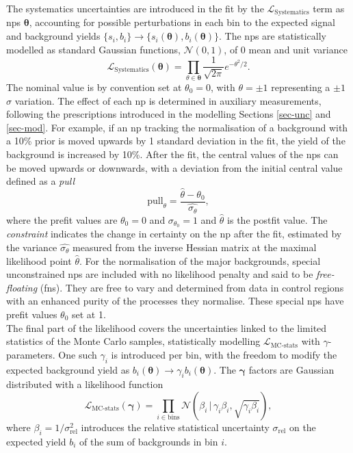 The systematics uncertainties are introduced in the fit by the $\mathcal{L}_{\text{Systematics}}$ term as \glspl{np} $\boldsymbol{\theta}$, accounting for possible perturbations in each bin to the expected signal and background yields $\{s_i, b_i\} \rightarrow \{s_i(\boldsymbol{\theta}), b_i(\boldsymbol{\theta})\}$. The \glspl{np} are statistically modelled as standard Gaussian functions, $\mathcal{N}(0, 1)$, of 0 mean and unit variance \[ \mathcal{L}_{\text{Systematics}}(\boldsymbol{\theta}) = \prod_{\theta \in \boldsymbol{\theta}} \frac{1}{\sqrt{2\pi}} e^{- \theta^2/2}.\] The nominal value is by convention set at $\theta_0 = 0$, with $\theta = \pm 1$ representing a $\pm1$ $\sigma$ variation. The effect of each \gls{np} is determined in auxiliary measurements, following the prescriptions introduced in the modelling Sections \ref{sec-unc} and \ref{sec-mod}. For example, if an \gls{np} tracking the normalisation of a background with a 10\% prior is moved upwards by 1 standard deviation in the fit, the yield of the background is increased by 10\%. After the fit, the central values of the \glspl{np} can be moved upwards or downwards, with a deviation from the initial central value defined as a \textit{pull} \[ \text{pull}_{\theta} = \frac{\hat{\theta} - \theta_0}{\hat{\sigma_{\theta}}}, \] where the prefit values are $\theta_0 = 0 $ and $\sigma_{\theta_0} = 1$ and $\hat{\theta}$ is the postfit value. The \textit{constraint} indicates the change in certainty on the \gls{np} after the fit, estimated by the variance $\hat{\sigma_{\theta}}$ measured from the inverse Hessian matrix at the maximal likelihood point $\hat{\theta}$. For the normalisation of the major backgrounds, special unconstrained \glspl{np} are included with no likelihood penalty and said to be \textit{free-floating} (\glspl{fn}). They are free to vary and determined from data in control regions with an enhanced purity of the processes they normalise. These special \glspl{np} have prefit values $\theta_0$ set at 1. \\

The final part of the likelihood covers the uncertainties linked to the limited statistics of the Monte Carlo samples, statistically modelling $\mathcal{L}_{\text{MC-stats}}$ with $\gamma$-parameters. One such $\gamma_i$ is introduced per bin, with the freedom to modify the expected background yield as $b_i(\boldsymbol{\theta}) \rightarrow \gamma_i b_i(\boldsymbol{\theta})$. The $\boldsymbol{\gamma}$ factors are Gaussian distributed with a likelihood function \[\mathcal{L}_{\text{MC-stats}}(\boldsymbol{\gamma}) = \prod_{i\in \textrm{bins}} \mathcal{N} \left(\beta_i \,|\, \gamma_i\beta_i, \sqrt{\gamma_i\beta_i} \right),\] where $\beta_i = 1 / \sigma_{\text{rel}}^2$ introduces the relative statistical uncertainty $\sigma_{\text{rel}}$ on the expected yield $b_i$ of the sum of backgrounds in bin $i$. \\

